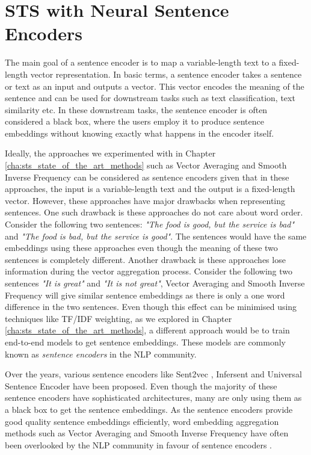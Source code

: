 \chapter{\label{cha:sts_sentence_encoders}STS with Neural Sentence Encoders}

The main goal of a sentence encoder is to map a variable-length text to a fixed-length vector representation. In basic terms, a sentence encoder takes a sentence or text as an input and outputs a vector. This vector encodes the meaning of the sentence and can be used for downstream tasks such as text classification, text similarity etc. In these downstream tasks, the sentence encoder is often considered a black box, where the users employ it to produce sentence embeddings without knowing exactly what happens in the encoder itself. 

Ideally, the approaches we experimented with in Chapter \ref{cha:sts_state_of_the_art_methods} such as Vector Averaging \autocite{mitchell-lapata-2008-vector} and Smooth Inverse Frequency \autocite{DBLP:conf/iclr/AroraLM17} can be considered as sentence encoders given that in these approaches, the input is a variable-length text and the output is a fixed-length vector. However, these approaches have major drawbacks when representing sentences. One such drawback is these approaches do not care about word order. Consider the following two sentences: \textit{"The food is good, but the service is bad"} and \textit{"The food is bad, but the service is good"}. The sentences would have the same embeddings using these approaches even though the meaning of these two sentences is completely different. Another drawback is these approaches lose information during the vector aggregation process. Consider the following two sentences \textit{"It is great"} and \textit{"It is not great"}, Vector Averaging and Smooth Inverse Frequency will give similar sentence embeddings as there is only a one word difference in the two sentences. Even though this effect can be minimised using techniques like TF/IDF weighting, as we explored in Chapter \ref{cha:sts_state_of_the_art_methods}, a different approach would be to train end-to-end models to get sentence embeddings. These models are commonly known as \textit{sentence encoders} in the NLP community.

Over the years, various sentence encoders like Sent2vec \autocite{pagliardini-etal-2018-unsupervised}, Infersent  \autocite{cer2018universal} and Universal Sentence Encoder \autocite{conneau-EtAl:2017:EMNLP2017} have been proposed. Even though the majority of these sentence encoders have sophisticated architectures, many are only using them as a black box to get the sentence embeddings. As the sentence encoders provide good quality sentence embeddings efficiently, word embedding aggregation methods such as Vector Averaging \autocite{mitchell-lapata-2008-vector} and Smooth Inverse Frequency \autocite{mitchell-lapata-2008-vector} have often been overlooked by the NLP community in favour of sentence encoders \autocite{logeswaran2018an}. 


